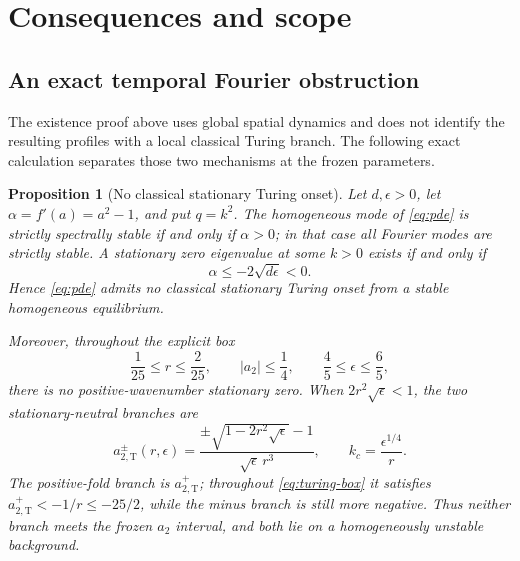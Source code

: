 \documentclass[11pt,reqno]{amsart}
\numberwithin{equation}{section}
\newtheorem{proposition}[theorem]{Proposition}
\theoremstyle{definition}
\theoremstyle{remark}
\begin{document}
\section{Consequences and scope}\label{sec:scope}

\subsection{An exact temporal Fourier obstruction}

The existence proof above uses global spatial dynamics and does not identify
the resulting profiles with a local classical Turing branch.  The following
exact calculation separates those two mechanisms at the frozen parameters.

\begin{proposition}[No classical stationary Turing onset]
\label{prop:turing-exclusion}
Let $d,\epsilon>0$, let $\alpha=f'(a)=a^2-1$, and put $q=k^2$.  The
homogeneous mode of \eqref{eq:pde} is strictly spectrally stable if and only
if $\alpha>0$; in that case all Fourier modes are strictly stable.  A
stationary zero eigenvalue at some $k>0$ exists if and only if
\[
 \alpha\leq-2\sqrt{d\epsilon}<0.
\]
Hence \eqref{eq:pde} admits no classical stationary Turing onset from a
stable homogeneous equilibrium.

Moreover, throughout the explicit box
\begin{equation}\label{eq:turing-box}
 \frac1{25}\le r\le\frac2{25},\qquad
 |a_2|\le\frac14,\qquad
 \frac45\le\epsilon\le\frac65,
\end{equation}
there is no positive-wavenumber stationary zero.  When
$2r^2\sqrt\epsilon<1$, the two stationary-neutral branches are
\begin{equation}\label{eq:turing-neutral-branch}
 a_{2,\mathrm T}^{\pm}(r,\epsilon)
 =\frac{\pm\sqrt{1-2r^2\sqrt\epsilon}-1}
        {\sqrt\epsilon\,r^3},
 \qquad k_c=\frac{\epsilon^{1/4}}r.
\end{equation}
The positive-fold branch is $a_{2,\mathrm T}^{+}$; throughout
\eqref{eq:turing-box} it satisfies
$a_{2,\mathrm T}^{+}<-1/r\le-25/2$, while the minus branch is still more
negative.  Thus neither branch meets the frozen $a_2$ interval, and both lie
on a homogeneously unstable background.
\end{proposition}
\end{document}
